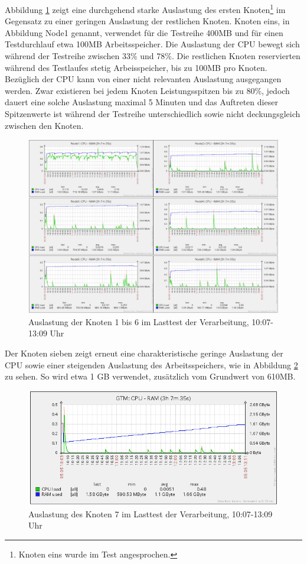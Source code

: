 Abbildung \ref{fig:auslastungTest2} zeigt eine durchgehend starke Auslastung des ersten Knoten\footnote{Knoten eins wurde im Test angesprochen.} im Gegensatz zu einer geringen Auslastung der restlichen Knoten.
Knoten eins, in Abbildung Node1 genannt, verwendet für die Testreihe 400MB und für einen Testdurchlauf etwa 100MB Arbeitsspeicher.
Die Auslastung der CPU bewegt sich während der Testreihe zwischen 33\%{} und 78\%{}.
Die restlichen Knoten reservierten während des Testlaufes stetig Arbeisspeicher, bis zu 100MB pro Knoten.
Bezüglich der CPU kann von einer nicht relevanten Auslastung ausgegangen werden.
Zwar existieren bei jedem Knoten Leistungsspitzen bis zu 80\%{}, jedoch dauert eine solche Auslastung maximal 5 Minuten und das Auftreten dieser Spitzenwerte ist während der Testreihe unterschiedlich sowie nicht deckungsgleich zwischen den Knoten.
\begin{figure}[h!]
\centering
\includegraphics[width=\textwidth]{Testergebnisse/jdbc_contouring_Testlauf.png}
\caption[Auslastung der Knoten 1 bis 6 im Lasttest der Verarbeitung]{Auslastung der Knoten 1 bis 6 im Lasttest der Verarbeitung, 10:07-13:09 Uhr}
\label{fig:auslastungTest2}
\end{figure}
Der Knoten sieben zeigt erneut eine charakteristische geringe Auslastung der CPU sowie einer steigenden Auslastung des Arbeitsspeichers, wie in Abbildung \ref{fig:auslastungTest2_gtm} zu sehen.
So wird etwa 1 GB verwendet, zusätzlich vom Grundwert von 610MB.
\begin{figure}[h!]
\centering
\includegraphics[width=\textwidth]{Testergebnisse/jdbc_contouring_Testlauf_bild2.png}
\caption[Auslastung des Knoten 7 im Lasttest der Verarbeitung]{Auslastung des Knoten 7 im Lasttest der Verarbeitung, 10:07-13:09 Uhr}
\label{fig:auslastungTest2_gtm}
\end{figure}

